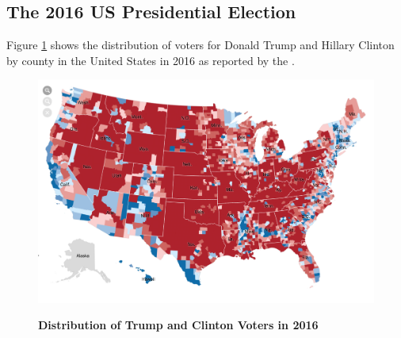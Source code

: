 \documentclass[12pt, titlepage]{article}
\newcommand\tb{\textbf}
\begin{document}
\begin{appendices}
	
\section{The 2016 US Presidential Election}
\label{AppendixE}

Figure \ref{figure3} shows the distribution of voters for Donald Trump and Hillary Clinton by county in the United States in 2016 as reported by the  \cite{NYT-trump}.

\begin{figure}[H]    \centering
	{	 \includegraphics[width=\textwidth]{NYT}}
	\caption{\tb{Distribution of Trump and Clinton Voters in 2016}}\label{figure3}
\end{figure}	

\clearpage




\end{appendices}
\end{document}
